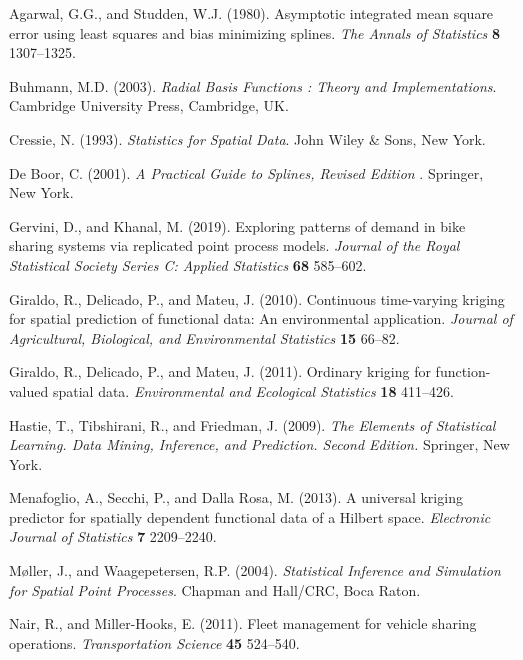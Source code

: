\documentclass[titlepage,12pt]{article}
\begin{document}
\begin{description}
\item Agarwal, G.G., and Studden, W.J. (1980). Asymptotic integrated mean
square error using least squares and bias minimizing splines. \emph{The
Annals of Statistics }\textbf{8} 1307--1325.

\item Buhmann, M.D. (2003). \emph{Radial Basis Functions : Theory and
Implementations}. Cambridge University Press, Cambridge, UK.

\item Cressie, N. (1993). \emph{Statistics for Spatial Data}. John Wiley \&
Sons, New York.

\item De Boor, C. (2001). \emph{A Practical Guide to Splines, Revised Edition%
}. Springer, New York.

\item Gervini, D., and Khanal, M. (2019). Exploring patterns of demand in
bike sharing systems via replicated point process models. \emph{Journal of
the Royal Statistical Society Series C: Applied Statistics} \textbf{68}
585--602.

\item Giraldo, R., Delicado, P., and Mateu, J. (2010). Continuous
time-varying kriging for spatial prediction of functional data: An
environmental application. \emph{Journal of Agricultural, Biological, and
Environmental Statistics} \textbf{15} 66--82.

\item Giraldo, R., Delicado, P., and Mateu, J. (2011). Ordinary kriging for
function-valued spatial data. \emph{Environmental and Ecological Statistics} 
\textbf{18} 411--426.

\item Hastie, T., Tibshirani, R., and Friedman, J. (2009). \emph{The
Elements of Statistical Learning. Data Mining, Inference, and Prediction.
Second Edition. }Springer, New York.

\item Menafoglio, A., Secchi, P., and Dalla Rosa, M. (2013). A universal
kriging predictor for spatially dependent functional data of a Hilbert
space. \emph{Electronic Journal of Statistics} \textbf{7} 2209--2240.

\item M\o ller, J., and Waagepetersen, R.P. (2004). \emph{Statistical
Inference and Simulation for Spatial Point Processes}. Chapman and Hall/CRC,
Boca Raton.

\item Nair, R., and Miller-Hooks, E. (2011). Fleet management for vehicle
sharing operations. \emph{Transportation Science }\textbf{45 }524--540.


\end{description}
\end{document}
